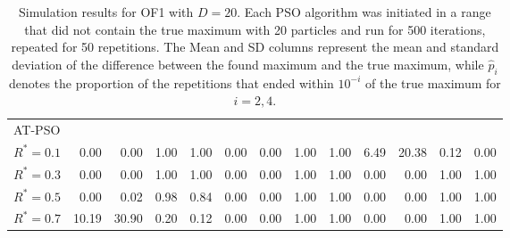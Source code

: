 \documentclass[12pt]{article}
\begin{document}
\begin{table}[ht]
{\begin{tabular}{r|rrrr|rrrr|rrrr}
\hline
\multicolumn{1}{l|}{AT-PSO} &&&&&&&&&&&&\\
  $R^* = 0.1$ & 0.00 & 0.00 & 1.00 & 1.00 & 0.00 & 0.00 & 1.00 & 1.00 & 6.49 & 20.38 & 0.12 & 0.00 \\ 
  $R^* = 0.3$ & 0.00 & 0.00 & 1.00 & 1.00 & 0.00 & 0.00 & 1.00 & 1.00 & 0.00 & 0.00 & 1.00 & 1.00 \\ 
  $R^* = 0.5$ & 0.00 & 0.02 & 0.98 & 0.84 & 0.00 & 0.00 & 1.00 & 1.00 & 0.00 & 0.00 & 1.00 & 1.00 \\ 
  $R^* = 0.7$ & 10.19 & 30.90 & 0.20 & 0.12 & 0.00 & 0.00 & 1.00 & 1.00 & 0.00 & 0.00 & 1.00 & 1.00 \\ 
   \hline
\end{tabular}
}
\caption{Simulation results for OF1 with $D=20$. Each PSO algorithm was initiated in a range that did not contain the true maximum with 20 particles and run for 500 iterations, repeated for 50 repetitions. The Mean and SD columns represent the mean and standard deviation of the difference between the found maximum and the true maximum, while $\widehat{p}_i$ denotes the proportion of the repetitions that ended within $10^{-i}$ of the true maximum for $i=2,4$.}
\label{tab:psosim1}
\end{table}
\end{document}
